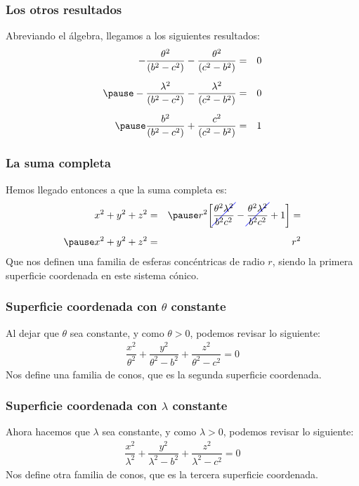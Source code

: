 \documentclass[12pt]{beamer}
\newcommand{\Cancel}[2][black]{{\color{#1}\cancel{\color{black}#2}}}
\begin{document}
\begin{frame}
\frametitle{Los otros resultados}
Abreviando el álgebra, llegamos a los siguientes resultados:
\pause
\begin{eqnarray*}
- \dfrac{\theta^{2}}{(b^{2} - c^{2})} - \dfrac{\theta^{2}}{(c^{2} - b^{2})} &=& 0 \\[0.5em] \pause
- \dfrac{\lambda^{2}}{(b^{2} - c^{2})} - \dfrac{\lambda^{2}}{(c^{2} - b^{2})} &=& 0 \\[0.5em] \pause
\dfrac{b^{2}}{(b^{2} - c^{2})} + \dfrac{c^{2}}{(c^{2} - b^{2})} &=& 1
\end{eqnarray*}
\end{frame}
\begin{frame}
\frametitle{La suma completa}
Hemos llegado entonces a que la suma completa es:
\begin{eqnarray*}
x^{2} + y^{2} + z^{2} &=& \pause r^{2} \bigg[ \Cancel[blue]{\dfrac{\theta^{2} \lambda^{2}}{b^{2} c^{2}}} - \Cancel[blue]{\dfrac{\theta^{2} \lambda^{2}}{b^{2} c^{2}}} + 1 \bigg] = \\[0.5em] \pause
x^{2} + y^{2} + z^{2} &=& r^{2}
\end{eqnarray*}
\pause
Que nos definen una familia de esferas concéntricas de radio $r$, siendo la primera superficie coordenada en este sistema cónico.
\end{frame}
\begin{frame}
\frametitle{Superficie coordenada con $\theta$ constante}
Al dejar que $\theta$ sea constante, y como $\theta > 0$, podemos revisar lo siguiente:
\pause
\begin{align*}
\dfrac{x^{2}}{\theta^{2}} + \dfrac{y^{2}}{\theta^{2} - b^{2}} + \dfrac{z^{2}}{\theta^{2} - c^{2}} = 0
\end{align*}
\pause
Nos define una familia de conos, que es la segunda superficie coordenada.
\end{frame}
\begin{frame}
\frametitle{Superficie coordenada con $\lambda$ constante}
Ahora hacemos que $\lambda$ sea constante, y como $\lambda > 0$, podemos revisar lo siguiente:
\pause
\begin{align*}
\dfrac{x^{2}}{\lambda^{2}} + \dfrac{y^{2}}{\lambda^{2} - b^{2}} + \dfrac{z^{2}}{\lambda^{2} - c^{2}} = 0
\end{align*}
\pause
Nos define otra familia de conos, que es la tercera superficie coordenada.
\end{frame}
\end{document}
